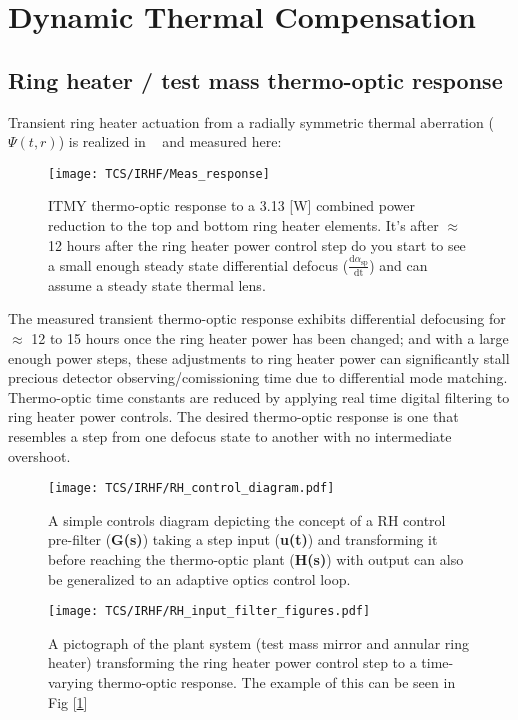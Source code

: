 \section{Dynamic Thermal Compensation}
\subsection{Ring heater / test mass thermo-optic response}
Transient ring heater actuation from a radially symmetric thermal aberration ($\Psi(t,r)$) is realized in ~\cite{ramette:2016} and measured here:

\begin{figure}[H]
    \centering
     \texttt{[image: TCS/IRHF/Meas\_response]}
     \caption{ITMY thermo-optic response to a 3.13 [W] combined power reduction to the top and bottom ring heater elements. It's after $\approx$ 12 hours after the ring heater power control step do you start to see a small enough steady state differential defocus ($\frac{\mathrm{d} \alpha_\mathrm{sp}}{\mathrm{dt}}$) and can assume a steady state thermal lens. }
     \label{fig:RHresp}
\end{figure}

The measured transient thermo-optic response exhibits differential defocusing for $\approx$ 12 to 15 hours once the ring heater power has been changed; and with a large enough power steps, these adjustments to ring heater power can significantly stall precious detector observing/comissioning time due to differential mode matching. Thermo-optic time constants are reduced by applying real time digital filtering to ring heater power controls. The desired thermo-optic response is one that resembles a step from one defocus state to another with no intermediate overshoot. 

\begin{figure}[H]
	\centering
	\texttt{[image: TCS/IRHF/RH\_control\_diagram.pdf]}
	\caption{A simple controls diagram depicting the concept of a RH control pre-filter (\textbf{G(s)}) taking a step input (\textbf{u(t)}) and transforming it before reaching the thermo-optic plant (\textbf{H(s)}) with output can also be generalized to an adaptive optics control loop.}
	\label{fig:RH_control}
\end{figure}

\begin{figure}[H]
    \centering
    \texttt{[image: TCS/IRHF/RH\_input\_filter\_figures.pdf]}
    \caption{A pictograph of the plant system (test mass mirror and annular ring heater) transforming the ring heater power control step to a time-varying thermo-optic response. The example of this can be seen in Fig [\ref{fig:RHresp}]}
    \label{fig:justplant}
\end{figure}

